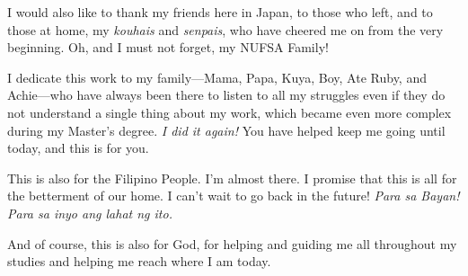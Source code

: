 \par I would also like to thank my friends here in Japan, to those who left, and to those at home, my \textit{kouhais} and \textit{senpais}, who have cheered me on from the very beginning. Oh, and I must not forget, my NUFSA Family!

\par I dedicate this work to my family—Mama, Papa, Kuya, Boy, Ate Ruby, and Achie—who have always been there to listen to all my struggles even if they do not understand a single thing about my work, which became even more complex during my Master's degree. \textit{I did it again!} You have helped keep me going until today, and this is for you.

\par This is also for the Filipino People. I'm almost there. I promise that this is all for the betterment of our home. I can't wait to go back in the future! \textit{Para sa Bayan! Para sa inyo ang lahat ng ito.}
\par And of course, this is also for God, for helping and guiding me all throughout my studies and helping me reach where I am today.

\normalsize
\doublespacing